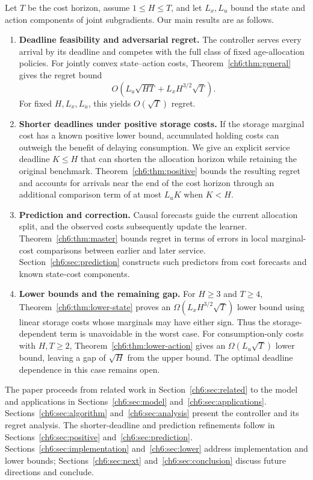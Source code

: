 \documentclass[11pt]{article}
\theoremstyle{plain}
\theoremstyle{remark}
\numberwithin{equation}{section}
\begin{document}
Let $T$ be the cost horizon, assume $1\le H\le T$, and let $L_x,L_u$ bound
the state and action components of joint subgradients. Our main results
are as follows.
\begin{enumerate}[leftmargin=*]
\item \textbf{Deadline feasibility and adversarial regret.}
The controller serves every arrival by its deadline and competes with the
full class of fixed age-allocation policies. For jointly convex
state--action costs, Theorem~\ref{ch6:thm:general} gives the regret bound
\[
 O\!\left(L_u\sqrt{HT}+L_xH^{3/2}\sqrt T\right).
\]
For fixed $H,L_x,L_u$, this yields $O(\sqrt T)$ regret.
\item \textbf{Shorter deadlines under positive storage costs.}
If the storage marginal cost has a known positive lower bound, accumulated
holding costs can outweigh the benefit of delaying consumption. We give an
explicit service deadline $K\le H$ that can shorten the allocation
horizon while retaining the original benchmark.
Theorem~\ref{ch6:thm:positive} bounds the resulting regret and accounts for
arrivals near the end of the cost horizon through an additional comparison
term of at most $L_uK$ when $K<H$.
\item \textbf{Prediction and correction.}
Causal forecasts guide the current allocation split, and the observed
costs subsequently update the learner. Theorem~\ref{ch6:thm:master} bounds
regret in terms of errors in local marginal-cost comparisons between
earlier and later service. Section~\ref{ch6:sec:prediction} constructs such
predictors from cost forecasts and known state-cost components.
\item \textbf{Lower bounds and the remaining gap.}
For $H\ge3$ and $T\ge4$, Theorem~\ref{ch6:thm:lower-state} proves an
$\Omega(L_xH^{3/2}\sqrt T)$ lower bound using linear storage costs whose
marginals may have either sign. Thus the storage-dependent term is
unavoidable in the worst case. For consumption-only costs with $H,T\ge2$,
Theorem~\ref{ch6:thm:lower-action} gives an $\Omega(L_u\sqrt T)$ lower bound,
leaving a gap of $\sqrt{H}$ from the upper bound. The optimal deadline
dependence in this case remains open.
\end{enumerate}

The paper proceeds from related work in Section~\ref{ch6:sec:related}
to the model and applications in Sections~\ref{ch6:sec:model}
and~\ref{ch6:sec:applications}. Sections~\ref{ch6:sec:algorithm}
and~\ref{ch6:sec:analysis} present the controller and its regret analysis.
The shorter-deadline and prediction refinements follow in
Sections~\ref{ch6:sec:positive} and~\ref{ch6:sec:prediction}.
Sections~\ref{ch6:sec:implementation} and~\ref{ch6:sec:lower} address
implementation and lower bounds; Sections~\ref{ch6:sec:next}
and~\ref{ch6:sec:conclusion} discuss future directions and conclude.
\end{document}
